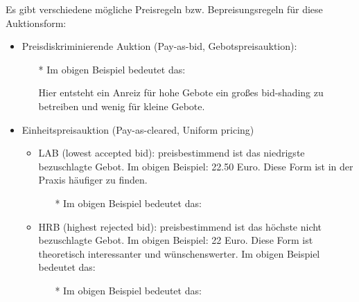 \documentclass[12pt]{extreport} %
\theoremstyle{named}
\theoremstyle{itshape}
\theoremstyle{normal}
\begin{document}
Es gibt verschiedene mögliche Preisregeln bzw. Bepreisungsregeln für diese Auktionsform:
\begin{itemize}
	\item Preisdiskriminierende Auktion (Pay-as-bid, Gebotspreisauktion): 
		\begin{itemize}
			\item[*] Im obigen Beispiel bedeutet das:
			Hier entsteht ein Anreiz für hohe Gebote ein großes bid-shading zu betreiben und wenig für kleine Gebote.
		\end{itemize}
	\item Einheitspreisauktion (Pay-as-cleared, Uniform pricing)
		\begin{itemize}
			\item LAB (lowest accepted bid): preisbestimmend ist das niedrigste bezuschlagte Gebot. Im obigen Beispiel: 22.50 Euro. Diese Form ist in der Praxis häufiger zu finden.
				\begin{itemize}
					\item[*] Im obigen Beispiel bedeutet das:
				\end{itemize}
			\item HRB (highest rejected bid): preisbestimmend ist das höchste nicht bezuschlagte Gebot. Im obigen Beispiel: 22 Euro. Diese Form ist theoretisch interessanter und wünschenswerter. 
				Im obigen Beispiel bedeutet das:
				\begin{itemize}
					\item[*] Im obigen Beispiel bedeutet das:
\end{itemize}
\end{itemize}
\end{itemize}
\end{document}
